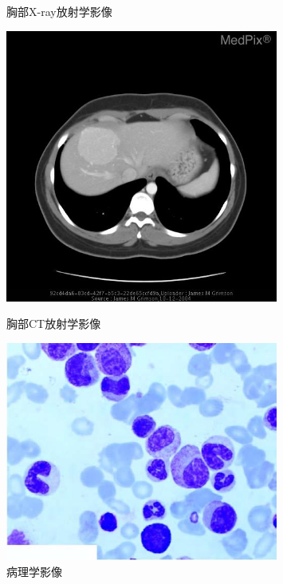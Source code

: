 \begin{figure}[htbp]
\begin{minipage}{0.5\linewidth}
		\caption{\label{open_confusionmatrix}胸部X-ray放射学影像} 	
	\end{minipage}	
    \begin{minipage}{0.5\linewidth}
		\centering	
		\includegraphics[width=0.8\textwidth]{Fig/myfig/chapter5/data_radct.jpg}  %
		\caption{\label{open_confusionmatrix}胸部CT放射学影像} 	
	\end{minipage}
    \begin{minipage}{0.5\linewidth}
		\centering	
		\includegraphics[width=0.8\textwidth]{Fig/myfig/chapter5/data_path.jpg}  %
		\caption{\label{open_confusionmatrix}病理学影像} 	
	\end{minipage}
\end{figure}


